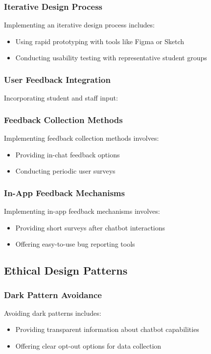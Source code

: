 \documentclass[14pt,a4paper]{article}
\begin{document}
\begin{multicols}{2}
\subsubsection*{Iterative Design Process}
Implementing an iterative design process \textit{\parencite[pp. 30-60]{HoltzblattBeyer2024}} includes:
\begin{itemize}
    \item Using rapid prototyping with tools like Figma or Sketch
    \item Conducting usability testing with representative student groups
\end{itemize}


\subsubsection{User Feedback Integration}
Incorporating student and staff input:

\subsubsection*{Feedback Collection Methods}
Implementing feedback collection methods \textit{\parencite[pp. 100-50]{TullisAlbert2024}} involves:
\begin{itemize}
    \item Providing in-chat feedback options
    \item Conducting periodic user surveys
\end{itemize}

\subsubsection*{In-App Feedback Mechanisms}
Implementing in-app feedback mechanisms \textit{\parencite[pp. 100-150]{TullisAlbert2024}} involves:
\begin{itemize}
    \item Providing short surveys after chatbot interactions
    \item Offering easy-to-use bug reporting tools
\end{itemize}

\subsection{Ethical Design Patterns}
\subsubsection{Dark Pattern Avoidance}
Avoiding dark patterns \textit{\parencite{Brignull2023}} includes:
\begin{itemize}
    \item Providing transparent information about chatbot capabilities
    \item Offering clear opt-out options for data collection
\end{itemize}



\end{multicols}
\end{document}
